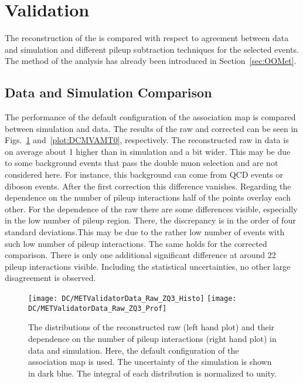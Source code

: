 \section{\texorpdfstring{\MET{}}{MET} Validation \label{sec:DCMV}}

The reconstruction of the \MET{} is compared with respect to agreement between data and simulation and different pileup subtraction techniques for the selected events. The method of the analysis has already been introduced in Section~\ref{sec:OOMet}. 

\subsection{Data and Simulation Comparison \label{sec:DCMVDSC}}
 
The performance of the default configuration of the association map is compared between simulation and data. The results of the raw and corrected \MET{} can be seen in Figs.~\ref{plot:DCMVAMRaw} and~\ref{plot:DCMVAMT0}, respectively. The reconstructed raw \MET{} in data is on average about 1\GeV{} higher than in simulation and a bit wider. This may be due to some background events that pass the double muon selection and are not considered here. For instance, this background can come from QCD events or diboson events. After the first correction this difference vanishes. Regarding the dependence on the number of pileup interactions half of the points overlay each other. For the dependence of the raw \MET{} there are some differences visible, especially in the low number of pileup region. There, the discrepancy is in the order of four standard deviations.This may be due to the rather low number of events with such  low number of pileup interactions. The same holds for the corrected \MET{} comparison. There is only one additional significant difference at around 22 pileup interactions visible. Including the statistical uncertainties, no other large disagreement is observed.

\begin{figure}[Ht]
  \centering
  \texttt{[image: DC/METValidatorData\_Raw\_ZQ3\_Histo]}
  \texttt{[image: DC/METValidatorData\_Raw\_ZQ3\_Prof]}
  \caption[Raw missing transverse energy distribution of different options of the association map in data and simulation]{The distributions of the reconstructed raw \MET{} (left hand plot) and their dependence on the number of pileup interactions (right hand plot) in data and simulation. Here, the default configuration of the association map is used. The uncertainty of the simulation is shown in dark blue. The integral of each distribution is normalized to unity. \label{plot:DCMVAMRaw}}
\end{figure}

